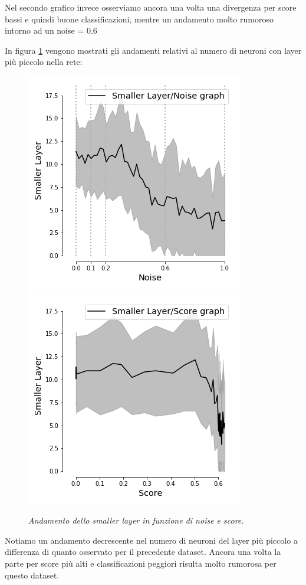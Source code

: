 \documentclass[12pt,a4paper]{report}
\begin{document}
Nel secondo grafico invece osserviamo ancora una volta una divergenza per score bassi e quindi buone classificazioni, mentre un andamento molto rumoroso intorno ad un noise = 0.6

In figura \ref{small-circles} vengono mostrati gli andamenti relativi al numero di neuroni con layer più piccolo nella rete: 

\begin{figure}[H]
 \centering
 \includegraphics[scale = 0.5]{images/small_noise_circles}
 \includegraphics[scale = 0.5]{images/small_Score_circles}
 \caption{\textit{Andamento dello smaller layer in funzione di noise e score.}}
 \label{small-circles}
\end{figure}

Notiamo un andamento decrescente nel numero di neuroni del layer più piccolo a differenza di quanto osservato per il precedente dataset.
Ancora una volta la parte per score più alti e classificazioni peggiori risulta molto rumorosa per questo dataset.
\end{document}
